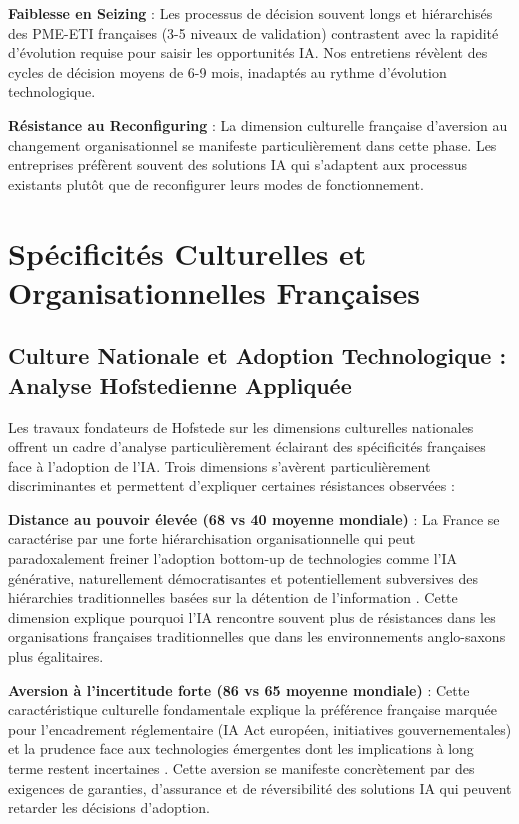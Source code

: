 \textbf{Faiblesse en Seizing} : Les processus de décision souvent longs et hiérarchisés des PME-ETI françaises (3-5 niveaux de validation) contrastent avec la rapidité d'évolution requise pour saisir les opportunités IA. Nos entretiens révèlent des cycles de décision moyens de 6-9 mois, inadaptés au rythme d'évolution technologique.

\textbf{Résistance au Reconfiguring} : La dimension culturelle française d'aversion au changement organisationnel se manifeste particulièrement dans cette phase. Les entreprises préfèrent souvent des solutions IA qui s'adaptent aux processus existants plutôt que de reconfigurer leurs modes de fonctionnement.

\section{Spécificités Culturelles et Organisationnelles Françaises}

\subsection{Culture Nationale et Adoption Technologique : Analyse Hofstedienne Appliquée}

Les travaux fondateurs de Hofstede \cite{hofstede2001culture} sur les dimensions culturelles nationales offrent un cadre d'analyse particulièrement éclairant des spécificités françaises face à l'adoption de l'IA. Trois dimensions s'avèrent particulièrement discriminantes et permettent d'expliquer certaines résistances observées :

\textbf{Distance au pouvoir élevée (68 vs 40 moyenne mondiale)} : La France se caractérise par une forte hiérarchisation organisationnelle qui peut paradoxalement freiner l'adoption bottom-up de technologies comme l'IA générative, naturellement démocratisantes et potentiellement subversives des hiérarchies traditionnelles basées sur la détention de l'information \cite{meyer2014culture}. Cette dimension explique pourquoi l'IA rencontre souvent plus de résistances dans les organisations françaises traditionnelles que dans les environnements anglo-saxons plus égalitaires.

\textbf{Aversion à l'incertitude forte (86 vs 65 moyenne mondiale)} : Cette caractéristique culturelle fondamentale explique la préférence française marquée pour l'encadrement réglementaire (IA Act européen, initiatives gouvernementales) et la prudence face aux technologies émergentes dont les implications à long terme restent incertaines \cite{bertolucci2024artificial}. Cette aversion se manifeste concrètement par des exigences de garanties, d'assurance et de réversibilité des solutions IA qui peuvent retarder les décisions d'adoption.

